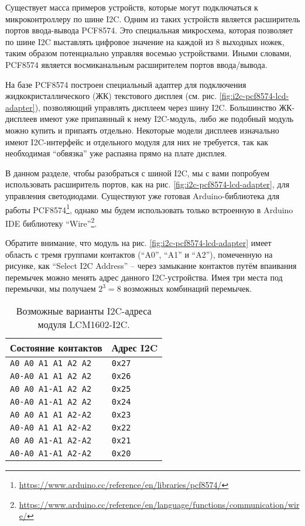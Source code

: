 \documentclass[../sparc.tex]{subfiles}
\begin{document}
Существует масса примеров устройств, которые могут подключаться к
микроконтроллеру по шине \gls{I2C}.  Одним из таких устройств является
расширитель портов ввода-вывода PCF8574.  Это специальная микросхема, которая
позволяет по шине I2C выставлять цифровое значение на каждой из 8 выходных
ножек, таким образом потенциально управляя восемью устройствами.  Иными словами,
PCF8574 является восмиканальным расширителем портов ввода/вывода.

На базе PCF8574 построен специальный адаптер для подключения
жидкокристаллического (ЖК) текстового дисплея
(см. рис. \ref{fig:i2c-pcf8574-lcd-adapter}), позволяющий управлять дисплеем
через шину I2C.  Большинство ЖК-дисплеев имеют уже припаянный к нему I2C-модуль,
либо же подобный модуль можно купить и припаять отдельно.  Некоторые модели
дисплеев изначально имеют I2C-интерфейс и отдельного модуля для них не
требуется, так как необходимая ``обвязка'' уже распаяна прямо на плате дисплея.

В данном разделе, чтобы разобраться с шиной I2C, мы с вами попробуем
использовать расширитель портов, как на рис. \ref{fig:i2c-pcf8574-lcd-adapter},
для управления светодиодами.  Существуют уже готовая Arduino-библиотека для
работы
PCF8574\footnote{\url{https://www.arduino.cc/reference/en/libraries/pcf8574/}},
однако мы будем использовать только встроенную в Arduino IDE библиотеку
``Wire''\footnote{\url{https://www.arduino.cc/reference/en/language/functions/communication/wire/}}.

Обратите внимание, что модуль на рис. \ref{fig:i2c-pcf8574-lcd-adapter} имеет
область с тремя группами контактов (``A0'', ``A1'' и ``A2''), помеченную на
рисунке, как ``Select I2C Address'' -- через замыкание контактов путём впаивания
перемычек можно менять адрес данного I2C-устройства.  Имея три места под
перемычки, мы получаем $2^3 = 8$ возможных комбинаций перемычек.

\begin{table}[H]
  \centering
  \begin{tabular}{ | m{12em} | m{2cm} | }
    \hline
    \textbf{Состояние контактов} & \textbf{Адрес I2C} \\
    \hline
    \texttt{A0 A0 A1 A1 A2 A2} & \texttt{0x27} \\
    \hline
    \texttt{A0-A0 A1 A1 A2 A2} & \texttt{0x26} \\
    \hline
    \texttt{A0 A0 A1-A1 A2 A2} & \texttt{0x25} \\
    \hline
    \texttt{A0-A0 A1-A1 A2 A2} & \texttt{0x24} \\
    \hline
    \texttt{A0 A0 A1 A1 A2-A2} & \texttt{0x23} \\
    \hline
    \texttt{A0-A0 A1 A1 A2-A2} & \texttt{0x22} \\
    \hline
    \texttt{A0 A0 A1-A1 A2-A2} & \texttt{0x21} \\
    \hline
    \texttt{A0-A0 A1-A1 A2-A2} & \texttt{0x20} \\
    \hline
  \end{tabular}
  \caption{Возможные варианты I2C-адреса модуля LCM1602-I2C.}
  \label{table:i2c-lcm1602-addressing}
\end{table}
\end{document}
